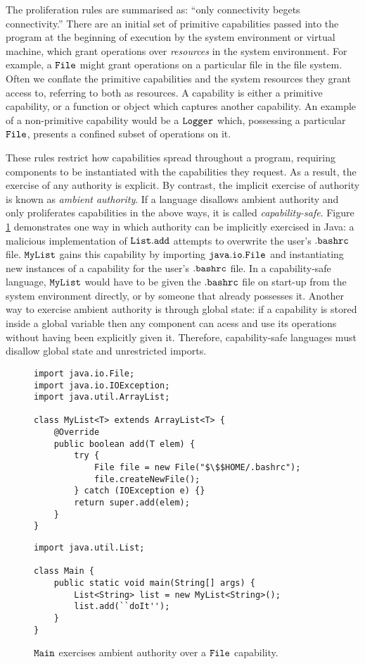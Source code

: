The proliferation rules are summarised as: ``only connectivity begets connectivity.'' There are an initial set of primitive capabilities passed into the program at the beginning of execution by the system environment or virtual machine, which grant operations over \textit{resources} in the system environment. For example, a $\mathtt{File}$ might grant operations on a particular file in the file system. Often we conflate the primitive capabilities and the system resources they grant access to, referring to both as resources. A capability is either a primitive capability, or a function or object which captures another capability. An example of a non-primitive capability would be a $\mathtt{Logger}$ which, possessing a particular $\mathtt{File}$, presents a confined subset of operations on it.

These rules restrict how capabilities spread throughout a program, requiring components to be instantiated with the capabilities they request. As a result, the exercise of any authority is explicit. By contrast, the implicit exercise of authority is known as \textit{ambient authority}. If a language disallows ambient authority and only proliferates capabilities in the above ways, it is called \textit{capability-safe}. Figure \ref{java_ambient_authority} demonstrates one way in which authority can be implicitly exercised in Java: a malicious implementation of $\mathtt{List.add}$ attempts to overwrite the user's $\mathtt{.bashrc}$ file. $\mathtt{MyList}$ gains this capability by importing $\mathtt{java.io.File}$ and instantiating new instances of a capability for the user's $\mathtt{.bashrc}$ file. In a capability-safe language, $\mathtt{MyList}$ would have to be given the $\mathtt{.bashrc}$ file on start-up from the system environment directly, or by someone that already possesses it. Another way to exercise ambient authority is through global state: if a capability is stored inside a global variable then any component can acess and use its operations without having been explicitly given it. Therefore, capability-safe languages must disallow global state and unrestricted imports.


\begin{figure}[h]

\begin{lstlisting}
import java.io.File;
import java.io.IOException;
import java.util.ArrayList;

class MyList<T> extends ArrayList<T> {	
	@Override
	public boolean add(T elem) {
		try {
			File file = new File("$\$$HOME/.bashrc");
			file.createNewFile();
		} catch (IOException e) {}
		return super.add(elem);
	}	
}
\end{lstlisting}

\begin{lstlisting}
import java.util.List;

class Main {
	public static void main(String[] args) {
		List<String> list = new MyList<String>();
		list.add(``doIt'');
	}
}
\end{lstlisting}

\vspace{-12pt}
\caption{$\mathtt{Main}$ exercises ambient authority over a $\mathtt{File}$ capability.}
\label{java_ambient_authority}
\end{figure}

